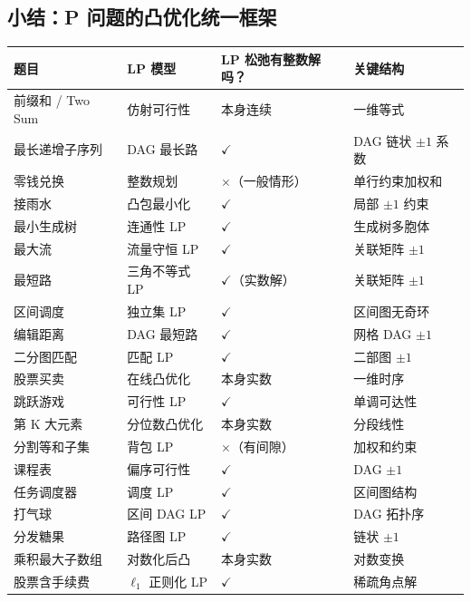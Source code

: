 \documentclass[12pt, a4paper]{ctexart}
\begin{document}
\subsection{小结：P 问题的凸优化统一框架}

\begin{blackboard}

\begin{center}
\begin{tabular}{llll}
\toprule
题目 & LP 模型 & LP 松弛有整数解吗？ & 关键结构 \\
\midrule
前缀和 / Two Sum & 仿射可行性 & 本身连续 & 一维等式 \\
最长递增子序列 & DAG 最长路 & $\checkmark$ & DAG 链状 $\pm 1$ 系数 \\
零钱兑换 & 整数规划 & $\times$（一般情形） & 单行约束加权和 \\
接雨水 & 凸包最小化 & $\checkmark$ & 局部 $\pm 1$ 约束 \\
最小生成树 & 连通性 LP & $\checkmark$ & 生成树多胞体 \\
最大流 & 流量守恒 LP & $\checkmark$ & 关联矩阵 $\pm 1$ \\
最短路 & 三角不等式 LP & $\checkmark$（实数解） & 关联矩阵 $\pm 1$ \\
区间调度 & 独立集 LP & $\checkmark$ & 区间图无奇环 \\
编辑距离 & DAG 最短路 & $\checkmark$ & 网格 DAG $\pm 1$ \\
二分图匹配 & 匹配 LP & $\checkmark$ & 二部图 $\pm 1$ \\
股票买卖 & 在线凸优化 & 本身实数 & 一维时序 \\
跳跃游戏 & 可行性 LP & $\checkmark$ & 单调可达性 \\
第 K 大元素 & 分位数凸优化 & 本身实数 & 分段线性 \\
分割等和子集 & 背包 LP & $\times$（有间隙） & 加权和约束 \\
课程表 & 偏序可行性 & $\checkmark$ & DAG $\pm 1$ \\
任务调度器 & 调度 LP & $\checkmark$ & 区间图结构 \\
打气球 & 区间 DAG LP & $\checkmark$ & DAG 拓扑序 \\
分发糖果 & 路径图 LP & $\checkmark$ & 链状 $\pm 1$ \\
乘积最大子数组 & 对数化后凸 & 本身实数 & 对数变换 \\
股票含手续费 & $\ell_1$ 正则化 LP & $\checkmark$ & 稀疏角点解 \\
\bottomrule
\end{tabular}
\end{center}

\end{blackboard}
\end{document}
